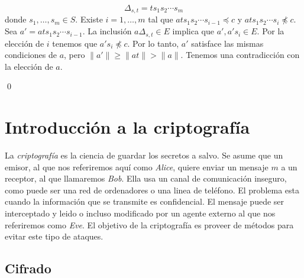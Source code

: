 \documentclass[12pt]{article}
\theoremstyle{definition}
\providecommand{\norm}[1]{\lVert#1\rVert}
\begin{document}
$$\Delta_{s,t}=ts_1s_2\cdots s_m$$
\newline
donde $s_1,\ldots,s_m\in S$. Existe $i=1,\ldots,m$ tal que $ats_1s_2\cdots s_{i-1}\preceq c$ y $ats_1s_2\cdots s_{i}\npreceq c$. Sea $a'=ats_1s_2\cdots s_{i-1}$. La inclusión $a\Delta_{s,t}\in E$ implica que $a',a's_i\in E$. Por la elección de $i$ tenemos que $a's_i\npreceq c$. Por lo tanto, $a'$ satisface las mismas condiciones de $a$, pero $\norm{a'}\geq \norm{at}> \norm{a}$. Tenemos una contradicción con la elección de $a$.

\qed































\section{Introducción a la criptografía}

La \textit{criptografía} es la ciencia de guardar los secretos a salvo. Se asume que un emisor, al que nos referiremos aquí como \textit{Alice}, quiere enviar un mensaje $m$ a un receptor, al que llamaremos \textit{Bob}. Ella usa un canal de comunicación inseguro, como puede ser una red de ordenadores o una linea de teléfono. El problema esta cuando la información que se transmite es confidencial. El mensaje puede ser interceptado y leido o incluso modificado por un agente externo al que nos referiremos como \textit{Eve}. El objetivo de la criptografía es proveer de métodos para evitar este tipo de ataques.

\subsection{Cifrado}
\end{document}
